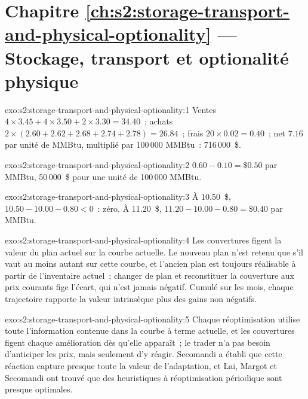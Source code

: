 \section*{Chapitre \ref{ch:s2:storage-transport-and-physical-optionality} --- Stockage, transport et optionalité physique}

\begin{solution}{exo:s2:storage-transport-and-physical-optionality:1}
Ventes $4 \times 3.45 + 4 \times 3.50 + 2 \times 3.30 = 34.40$~; achats $2 \times (2.60 + 2.62 + 2.68 + 2.74 + 2.78) = 26.84$~; frais $20 \times 0.02
= 0.40$~; net $7.16$ par unité de MMBtu, multiplié par 100\,000 MMBtu~: 716\,000~\$.
\end{solution}

\begin{solution}{exo:s2:storage-transport-and-physical-optionality:2}
$0.60 - 0.10 = \$0.50$ par MMBtu, 50\,000~\$ pour une unité de 100\,000 MMBtu.
\end{solution}

\begin{solution}{exo:s2:storage-transport-and-physical-optionality:3}
À 10.50~\$, $10.50 - 10.00 - 0.80 < 0$~: zéro. À 11.20~\$, $11.20 - 10.00 - 0.80 = \$0.40$ par MMBtu.
\end{solution}

\begin{solution}{exo:s2:storage-transport-and-physical-optionality:4}
Les couvertures figent la valeur du plan actuel sur la courbe actuelle. Le nouveau plan n'est retenu que s'il vaut au moins autant sur cette courbe, et l'ancien
plan est toujours réalisable à partir de l'inventaire actuel~; changer de plan et reconstituer la couverture aux prix courants fige l'écart, qui n'est jamais négatif. Cumulé
sur les mois, chaque trajectoire rapporte la valeur intrinsèque plus des gains non négatifs.
\end{solution}

\begin{solution}{exo:s2:storage-transport-and-physical-optionality:5}
Chaque réoptimisation utilise toute l'information contenue dans la courbe à terme actuelle, et les couvertures figent chaque amélioration dès qu'elle apparaît~; le trader n'a pas
besoin d'anticiper les prix, mais seulement d'y réagir. Secomandi a établi que cette réaction capture presque toute la valeur de l'adaptation, et Lai, Margot et
Secomandi ont trouvé que des heuristiques à réoptimisation périodique sont presque optimales.
\end{solution}

